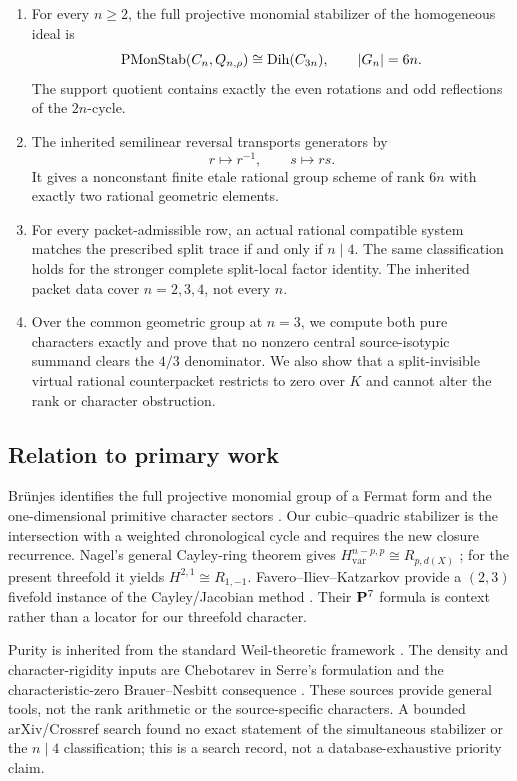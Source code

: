 \begin{enumerate}[leftmargin=*]
\item For every \(n\ge2\), the full projective monomial stabilizer of the
homogeneous ideal is
\[
\operatorname{PMonStab}(C_n,Q_{n,\rho})\cong\operatorname{Dih}(C_{3n}),\qquad |G_n|=6n.
\]
The support quotient contains exactly the even rotations and odd reflections
of the \(2n\)-cycle.
\item The inherited semilinear reversal transports generators by
\[
r\longmapsto r^{-1},\qquad s\longmapsto rs.
\]
It gives a nonconstant finite etale rational group scheme of rank \(6n\)
with exactly two rational geometric elements.
\item For every packet-admissible row, an actual rational compatible system
matches the prescribed split trace if and only if \(n\mid4\).  The same
classification holds for the stronger complete split-local factor identity.
The inherited packet data cover \(n=2,3,4\), not every \(n\).
\item Over the common geometric group at \(n=3\), we compute both pure
characters exactly and prove that no nonzero central source-isotypic summand
clears the \(4/3\) denominator.  We also show that a split-invisible virtual
rational counterpacket restricts to zero over \(K\) and cannot alter the
rank or character obstruction.
\end{enumerate}

\subsection*{Relation to primary work}

Br\"unjes identifies the full projective monomial group of a Fermat form and
the one-dimensional primitive character sectors
\cite[Proposition 3.8, Lemma/Definition 4.3, and
Theorem 4.6]{Brunjes2003}.  Our cubic--quadric stabilizer is the intersection
with a weighted chronological cycle and requires the new closure recurrence.
Nagel's general Cayley-ring theorem gives
\(H_{\mathrm{var}}^{n-p,p}\cong R_{p,d(X)}\)
\cite[Proposition 2.16]{Nagel1997}; for the present threefold it yields
\(H^{2,1}\cong R_{1,-1}\).  Favero--Iliev--Katzarkov provide a
\((2,3)\) fivefold instance of the Cayley/Jacobian method
\cite[\S5.4]{FaveroIlievKatzarkov2014}.  Their \(\mathbf P^7\) formula is
context rather than a locator for our threefold character.

Purity is inherited from the standard Weil-theoretic framework
\cite{Deligne1980}.  The density and character-rigidity inputs are
Chebotarev in Serre's formulation
\cite[\S2.1, Theorem 1]{Serre1981} and the characteristic-zero
Brauer--Nesbitt consequence \cite{BrauerNesbitt1941}.  These sources provide
general tools, not the rank arithmetic or the source-specific characters.
A bounded arXiv/Crossref search found no exact statement of the simultaneous
stabilizer or the \(n\mid4\) classification; this is a search record, not a
database-exhaustive priority claim.

